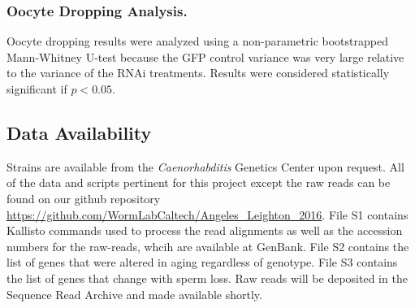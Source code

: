 \documentclass[10pt,letterpaper,twocolumn]{article}
\begin{document}
\subsubsection*{Oocyte Dropping Analysis.}

Oocyte dropping results were analyzed using a non-parametric bootstrapped Mann-Whitney U-test because the GFP control variance was very large relative to the variance of the RNAi treatments. Results were considered statistically significant if $p<0.05$.


\subsection*{Data Availability}
\label{sb:data_availability}
Strains are available from the \emph{Caenorhabditis} Genetics Center upon request. All of the data and scripts pertinent for this project except the raw reads can be found on our github repository \url{https://github.com/WormLabCaltech/Angeles_Leighton_2016}. File S1 contains Kallisto commands used to process the read alignments as well as the accession numbers for the raw-reads, whcih are available at GenBank. File S2 contains the list of genes that were altered in aging regardless of genotype. File S3 contains the list of genes that change with sperm loss. Raw reads will be deposited in the Sequence Read Archive and made available shortly.
\end{document}
